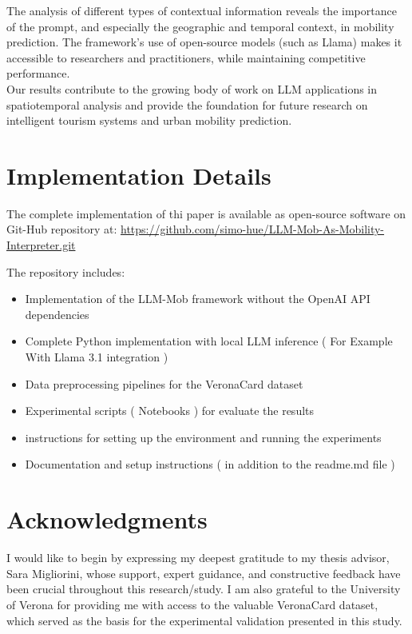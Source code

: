 \documentclass[12pt,a4paper]{article}
\begin{document}
The analysis of different types of contextual information reveals the importance of the prompt, and especially the geographic and temporal context, in mobility prediction. The framework's use of open-source models (such as Llama) makes it accessible to researchers and practitioners, while maintaining competitive performance.\\

Our results contribute to the growing body of work on LLM applications in spatiotemporal analysis and provide the foundation for future research on intelligent tourism systems and urban mobility prediction.\\

\section{Implementation Details}

The complete implementation of thi paper is available as open-source software on Git-Hub repository at:
\url{https://github.com/simo-hue/LLM-Mob-As-Mobility-Interpreter.git}

The repository includes:
\begin{itemize}
\item Implementation of the LLM-Mob framework without the OpenAI API dependencies    
\item Complete Python implementation with local LLM inference ( For Example With Llama 3.1 integration )
\item Data preprocessing pipelines for the VeronaCard dataset
\item Experimental scripts ( Notebooks ) for evaluate the results
\item instructions for setting up the environment and running the experiments
\item Documentation and setup instructions ( in addition to the readme.md file )
\end{itemize}

\section{Acknowledgments}

I would like to begin by expressing my deepest gratitude to my thesis advisor, Sara Migliorini, whose support, expert guidance, and constructive feedback have been crucial throughout this research/study. I am also grateful to the University of Verona for providing me with access to the valuable VeronaCard dataset, which served as the basis for the experimental validation presented in this study.\\
\end{document}
